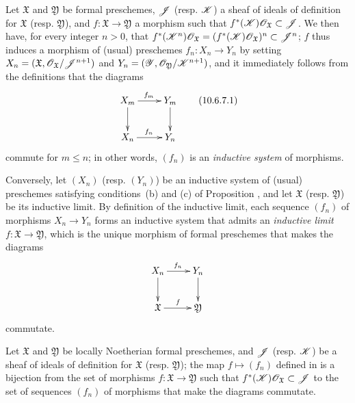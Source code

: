 \begin{env}[10.6.7]
\label{I.10.6.7}
Let $\mathfrak{X}$ and $\mathfrak{Y}$ be formal preschemes, $\mathscr{J}$ (resp. $\mathscr{K}$) a sheaf of ideals of definition for $\mathfrak{X}$ (resp. $\mathfrak{Y}$), and $f:\mathfrak{X}\to\mathfrak{Y}$ a morphism such that $f^*(\mathscr{K})\mathscr{O}_\mathfrak{X}\subset\mathscr{J}$.
We then have, for every integer $n>0$, that $f^*(\mathscr{K}^n)\mathscr{O}_\mathfrak{X}=(f^*(\mathscr{K})\mathscr{O}_\mathfrak{X})^n\subset\mathscr{J}^n$; $f$ thus induces  a morphism of (usual) preschemes $f_n:X_n\to Y_n$ by setting $X_n=(\mathfrak{X},\mathscr{O}_\mathfrak{X}/\mathscr{J}^{n+1})$ and $Y_n=(\mathscr{Y},\mathscr{O}_\mathfrak{Y}/\mathscr{K}^{n+1})$, and it immediately follows from the definitions that the diagrams
\[
\label{I.10.6.7.1}
  \xymatrix{
    X_m\ar[r]^{f_m}\ar[d] &
    Y_m\ar[d]\\
    X_n\ar[r]^{f_n} &
    Y_n
  }
  \tag{10.6.7.1}
\]
commute for $m\leq n$; in other words, $(f_n)$ is an \emph{inductive system} of morphisms.
\end{env}

\begin{env}[10.6.8]
\label{I.10.6.8}
Conversely, let $(X_n)$ (resp. $(Y_n)$) be an inductive system of (usual) preschemes satisfying conditions~(b) and (c) of Proposition , and let $\mathfrak{X}$ (resp. $\mathfrak{Y}$) be its inductive limit.
By definition of the inductive limit, each sequence $(f_n)$ of morphisms $X_n\to Y_n$ forms an inductive system that admits an \emph{inductive limit $f:\mathfrak{X}\to\mathfrak{Y}$}, which is the unique morphism of formal preschemes that makes the diagrams
\[
  \xymatrix{
    X_n\ar[r]^{f_n}\ar[d] &
    Y_n\ar[d]\\
    \mathfrak{X}\ar[r]^f &
    \mathfrak{Y}
  }
\]
commutate.
\end{env}

\begin{proposition}[10.6.9]
\label{I.10.6.9}
Let $\mathfrak{X}$ and $\mathfrak{Y}$ be locally Noetherian formal preschemes, and $\mathscr{J}$ (resp. $\mathscr{K}$) be a sheaf of ideals of definition for $\mathfrak{X}$ (resp. $\mathfrak{Y}$); the map $f\mapsto(f_n)$ defined in  is a bijection from the set of morphisms $f:\mathfrak{X}\to\mathfrak{Y}$ such that $f^*(\mathscr{K})\mathscr{O}_\mathfrak{X}\subset\mathscr{J}$ to the set of sequences $(f_n)$ of morphisms that make the diagrams  commutate.
\end{proposition}

